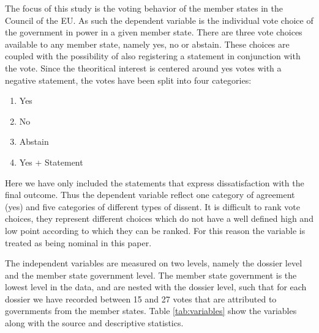 The focus of this study is the voting behavior of the member states in the Council of the EU. As such the dependent variable is the individual vote choice of the government in power in a given member state. There are three vote choices available to any member state, namely yes, no or abstain. These choices are coupled with the possibility of also registering a statement in conjunction with the vote. Since the theoritical interest is centered around yes votes with a negative statement, the votes have been split into four categories:

\begin{enumerate}
\item Yes
\item No
\item Abstain
\item Yes + Statement
\end{enumerate}

Here we have only included the statements that express dissatisfaction with the final outcome. Thus the dependent variable reflect one category of agreement (yes) and five categories of different types of dissent. It is difficult to rank vote choices, they represent different choices which do not have a well defined high and low point according to which they can be ranked. For this reason the variable is treated as being nominal in this paper. 

The independent variables are measured on two levels, namely the dossier level and the member state government level. The member state government is the lowest level in the data, and are nested with the dossier level, such that for each dossier we have recorded between 15 and 27 votes that are attributed to governments from the member states. Table \ref{tab:variables} show the variables along with the source and descriptive statistics. 




